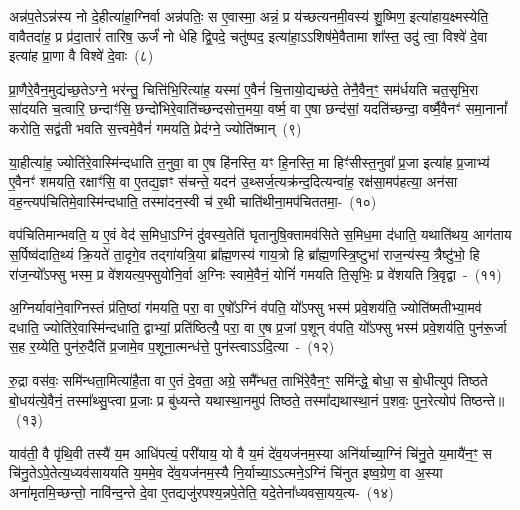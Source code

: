 {}

अन्न॑प॒ते\-ऽन्न॑स्य नो दे॒हीत्या॑हा॒ग्निर्वा अन्न॑पतिः॒ स ए॒वास्मा॒ अन्नं॒ प्र य॑च्छत्यनमी॒वस्य॑ शु॒ष्मिण॒ इत्या॑हाय॒क्ष्मस्येति॒ वावैतदा॑ह॒ प्र प्र॑दा॒तारं॑ तारिष॒ ऊर्जं॑ नो धेहि द्वि॒पदे॒ चतु॑ष्पद॒ इत्या॑हा॒\-ऽऽ\-शिष॑मे॒वैतामा शा᳚स्त॒ उदु॑ त्वा॒ विश्वे॑ दे॒वा इत्या॑ह प्रा॒णा वै विश्वे॑ दे॒वाः~(८)\ip

प्रा॒णैरे॒वैन॒मुद्य॑च्छ॒ते\-ऽग्ने॒ भर॑न्तु॒ चित्ति॑भि॒रित्या॑ह॒ यस्मा॑ ए॒वैनं॑ चि॒त्तायो॒द्यच्छ॑ते॒ तेनै॒वैन॒ꣳ॒ सम॑र्धयति चत॒सृभि॒रा सा॑दयति च॒त्वारि॒ छन्दाꣳ॑सि॒ छन्दो॑भिरे॒वाति॑च्छन्दसोत्त॒मया॒ वर्ष्म॒ वा ए॒षा छन्द॑सां॒ यदति॑च्छन्दा॒ वर्ष्मै॒वैनꣳ॑ समा॒नानां᳚ करोति॒ सद्व॑ती भवति स॒त्त्वमे॒वैनं॑ गमयति॒ प्रेद॑ग्ने॒ ज्योति॑ष्मान्~(९)\ip

या॒हीत्या॑ह॒ ज्योति॑रे॒वास्मि॑न्दधाति त॒नुवा॒ वा ए॒ष हि॑नस्ति॒ यꣳ हि॒नस्ति॒ मा हिꣳ॑सीस्त॒नुवा᳚ प्र॒जा इत्या॑ह प्र॒जाभ्य॑ ए॒वैनꣳ॑ शमयति॒ रक्षाꣳ॑सि॒ वा ए॒तद्य॒ज्ञꣳ स॑चन्ते॒ यदन॑ उ॒थ्सर्ज॒त्यक्र॑न्द॒दित्यन्वा॑ह॒ रक्ष॑सा॒मप॑हत्या॒ अन॑सा वह॒न्त्यप॑चितिमे॒वास्मि॑न्दधाति॒ तस्मा॑दन॒स्वी च॑ र॒थी चाति॑थीना॒मप॑चिततमा॒-~(१०)\ip

वप॑चितिमान्भवति॒ य ए॒वं वेद॑ स॒मिधा॒\-ऽग्निं दु॑वस्य॒तेति॑ घृतानुषि॒क्तामव॑सिते स॒मिध॒मा द॑धाति॒ यथाति॑थय॒ आग॑ताय स॒र्पिष्व॑दाति॒थ्यं क्रि॒यते॑ ता॒दृगे॒व तद्गा॑यत्रि॒या ब्रा᳚ह्म॒णस्य॑ गाय॒त्रो हि ब्रा᳚ह्म॒णस्त्रि॒ष्टुभा॑ राज॒न्य॑स्य॒ त्रैष्टु॑भो॒ हि रा॑ज॒न्यो᳚\-ऽफ्सु भस्म॒ प्र वे॑शयत्य॒फ्सुयो॑नि॒र्वा अ॒ग्निः स्वामे॒वैनं॒ योनिं॑ गमयति ति॒सृभिः॒ प्र वे॑शयति त्रि॒वृद्वा~-~(११)\ip

अ॒ग्निर्यावा॑ने॒वाग्निस्तं प्र॑ति॒ष्ठां ग॑मयति॒ परा॒ वा ए॒षो᳚\-ऽग्निं व॑पति॒ यो᳚\-ऽफ्सु भस्म॑ प्रवे॒शय॑ति॒ ज्योति॑ष्मतीभ्या॒मव॑ दधाति॒ ज्योति॑रे॒वास्मि॑न्दधाति॒ द्वाभ्यां॒ प्रति॑ष्ठित्यै॒ परा॒ वा ए॒ष प्र॒जां प॒शून् व॑पति॒ यो᳚\-ऽफ्सु भस्म॑ प्रवे॒शय॑ति॒ पुन॑रू॒र्जा स॒ह र॒य्येति॒ पुन॑रु॒दैति॑ प्र॒जामे॒व प॒शूना॒त्मन्ध॑त्ते॒ पुन॑स्त्वाऽऽदि॒त्या~-~(१२)\ip

रु॒द्रा वस॑वः॒ समि॑न्धता॒मित्या॑है॒ता वा ए॒तं दे॒वता॒ अग्रे॒ समै᳚न्धत॒ ताभि॑रे॒वैन॒ꣳ॒ समि॑न्द्धे॒ बोधा॒ स बो॒धीत्युप॑ तिष्ठते बो॒धय॑त्ये॒वैनं॒ तस्मा᳚थ्सु॒प्त्वा प्र॒जाः प्र बु॑ध्यन्ते यथास्था॒नमुप॑ तिष्ठते॒ तस्मा᳚द्\-यथास्था॒नं प॒शवः॒ पुन॒रेत्योप॑ तिष्ठन्ते॥~(१३)\ip

{}

याव॑ती॒ वै पृ॑थि॒वी तस्यै॑ य॒म आधि॑पत्यं॒ परी॑याय॒ यो वै य॒मं दे॑व॒यज॑नम॒स्या अनि॑र्याच्या॒ग्निं चि॑नु॒ते य॒मायै॑न॒ꣳ॒ स चि॑नु॒ते\-ऽपे॒तेत्य॒ध्यव॑साययति य॒ममे॒व दे॑व॒यज॑नम॒स्यै नि॒र्याच्या॒\-ऽऽ\-त्मने॒\-ऽग्निं चि॑नुत इष्व॒ग्रेण॒ वा अ॒स्या अना॑मृतमि॒च्छन्तो॒ नावि॑न्द॒न्ते दे॒वा ए॒तद्यजु॑रपश्य॒न्नपे॒तेति॒ यदे॒तेना᳚ध्यवसा॒यय॒त्य-~(१४)\ip

